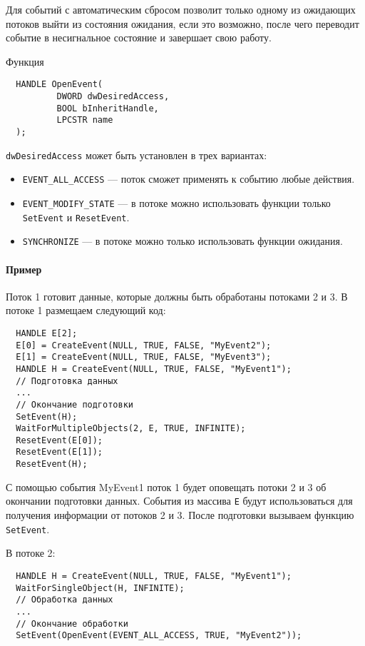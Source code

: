 Для событий с автоматическим сбросом позволит только одному из ожидающих потоков
выйти из состояния ожидания, если это возможно, после чего переводит событие в
несигнальное состояние и завершает свою работу.

Функция 
\begin{verbatim}
  HANDLE OpenEvent(
          DWORD dwDesiredAccess,
          BOOL bInheritHandle,
          LPCSTR name
  );
\end{verbatim}
\verb!dwDesiredAccess! может быть установлен в трех вариантах:
\begin{itemize}
  \item \verb!EVENT_ALL_ACCESS! --- поток сможет применять к событию любые
    действия.
  \item \verb!EVENT_MODIFY_STATE! --- в потоке можно использовать функции только
    \verb!SetEvent! и \verb!ResetEvent!.
  \item \verb!SYNCHRONIZE! --- в потоке можно только использовать функции
    ожидания.
\end{itemize}

\paragraph{Пример}\mbox{}\par
Поток 1 готовит данные, которые должны быть обработаны потоками 2 и 3.
В потоке 1 размещаем следующий код:
\begin{verbatim}
  HANDLE E[2];
  E[0] = CreateEvent(NULL, TRUE, FALSE, "MyEvent2");
  E[1] = CreateEvent(NULL, TRUE, FALSE, "MyEvent3");
  HANDLE H = CreateEvent(NULL, TRUE, FALSE, "MyEvent1");
  // Подготовка данных
  ...
  // Окончание подготовки
  SetEvent(H);
  WaitForMultipleObjects(2, E, TRUE, INFINITE);
  ResetEvent(E[0]);
  ResetEvent(E[1]);
  ResetEvent(H);
\end{verbatim}

С помощью события MyEvent1 поток 1 будет оповещать потоки 2 и 3 об окончании
подготовки данных. События из массива \verb!E! будут использоваться для
получения информации от потоков 2 и 3. После подготовки вызываем функцию
\verb!SetEvent!.

В потоке 2:
\begin{verbatim}
  HANDLE H = CreateEvent(NULL, TRUE, FALSE, "MyEvent1");
  WaitForSingleObject(H, INFINITE);
  // Обработка данных
  ...
  // Окончание обработки
  SetEvent(OpenEvent(EVENT_ALL_ACCESS, TRUE, "MyEvent2"));
\end{verbatim}
